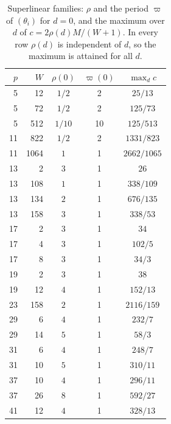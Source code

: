 \begin{table}[htbp]
\centering\small
\caption{Superlinear families: $\rho$ and the period $\varpi$ of $(\theta_i)$ for $d=0$, and the maximum over $d$ of $c=2\rho(d)M/(W+1)$. In every row $\rho(d)$ is independent of $d$, so the maximum is attained for all $d$.}\label{tab:superlinear}
\begin{tabular}{rrccc}
\toprule
$p$ & $W$ & $\rho(0)$ & $\varpi(0)$ & $\max_dc$\\
\midrule
5 & 12 & $1/2$ & 2 & $25/13$\\
5 & 72 & $1/2$ & 2 & $125/73$\\
5 & 512 & $1/10$ & 10 & $125/513$\\
11 & 822 & $1/2$ & 2 & $1331/823$\\
11 & 1064 & $1$ & 1 & $2662/1065$\\
13 & 2 & $3$ & 1 & $26$\\
13 & 108 & $1$ & 1 & $338/109$\\
13 & 134 & $2$ & 1 & $676/135$\\
13 & 158 & $3$ & 1 & $338/53$\\
17 & 2 & $3$ & 1 & $34$\\
17 & 4 & $3$ & 1 & $102/5$\\
17 & 8 & $3$ & 1 & $34/3$\\
19 & 2 & $3$ & 1 & $38$\\
19 & 12 & $4$ & 1 & $152/13$\\
23 & 158 & $2$ & 1 & $2116/159$\\
29 & 6 & $4$ & 1 & $232/7$\\
29 & 14 & $5$ & 1 & $58/3$\\
31 & 6 & $4$ & 1 & $248/7$\\
31 & 10 & $5$ & 1 & $310/11$\\
37 & 10 & $4$ & 1 & $296/11$\\
37 & 26 & $8$ & 1 & $592/27$\\
41 & 12 & $4$ & 1 & $328/13$\\
\bottomrule
\end{tabular}
\end{table}
